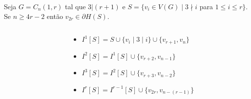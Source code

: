 


\begin{frame}{}
    \begin{lema}
        \label{lemma-carat-1-rx3}
        Seja $G = C_n(1,r)$ tal que $3 | (r+1)$ e $S = \{v_i \in V(G) \;|\; 3 \nmid i$ para $1\le i \le r\}$. Se $n \ge 4r - 2$ então $ v_{2r} \in  \partial H(S)$.
    \end{lema}
    
    \begin{columns}
        \begin{column}{0.7\textwidth}
            \resizebox{\textwidth}{!}{
                
            }
            \resizebox{\textwidth}{!}{
                
            }
        \end{column}
        \begin{column}{0.3\textwidth}
            \footnotesize
            \begin{itemize}
                \tightlist
                \item<2-> $I^1[S]=S\cup \{ v_i \; | \; 3 \mid i \} \cup \{v_{r+1}, v_n \}$
                \item<3-> $I^2[S]=I^1[S]\cup\{v_{r+2}, v_{n-1}\}$
                \item<4-> $I^3[S]=I^2[S]\cup\{v_{r+3}, v_{n-2}\}$
                \item<5-> $I^{r}[S]=I^{r-1}[S]\cup\{v_{2r}, v_{n-(r-1)}\}$
            \end{itemize}
        \end{column}
    \end{columns}
\end{frame}


